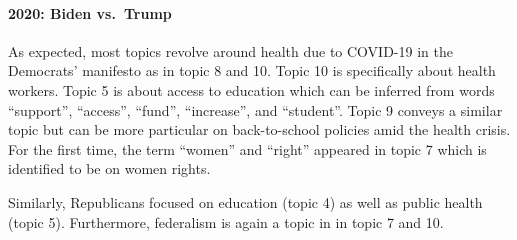 \documentclass[
]{article}
\begin{document}
\hypertarget{biden-vs.-trump}{%
\paragraph{2020: Biden vs.~Trump}\label{biden-vs.-trump}}

As expected, most topics revolve around health due to COVID-19 in the
Democrats' manifesto as in topic 8 and 10. Topic 10 is specifically
about health workers. Topic 5 is about access to education which can be
inferred from words ``support'', ``access'', ``fund'', ``increase'', and
``student''. Topic 9 conveys a similar topic but can be more particular
on back-to-school policies amid the health crisis. For the first time,
the term ``women'' and ``right'' appeared in topic 7 which is identified
to be on women rights.

Similarly, Republicans focused on education (topic 4) as well as public
health (topic 5). Furthermore, federalism is again a topic in in topic 7
and 10.
\end{document}
